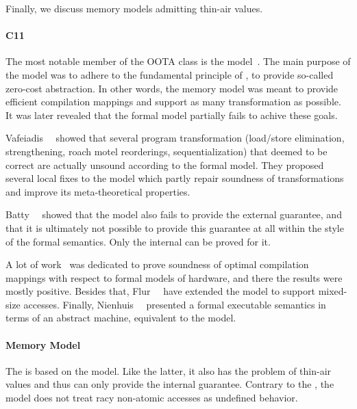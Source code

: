 Finally, we discuss memory models admitting thin-air values. 

\paragraph{C11}

The most notable member of the OOTA class is the \CMM model~\cite{Batty-al:POPL11}.
The main purpose of the \CMM model was to adhere to the fundamental principle of \CPP, 
\ie to provide so-called zero-cost abstraction. 
In other words, the memory model was meant to provide 
efficient compilation mappings and support as many transformation as possible.
It was later revealed that the formal model partially fails to achive these goals.

Vafeiadis~\etal~\cite{Vafeiadis-al:POPL15} showed that several program transformation 
(load/store elimination, strengthening, roach motel reorderings, sequentialization) 
that deemed to be correct are actually unsound according to the formal model.
They proposed several local fixes to the model which 
partly repair soundness of transformations and improve 
its meta-theoretical properties. 

Batty~\etal~\cite{Batty-al:ESOP15} showed that 
the model also fails to provide the external \DRF guarantee, 
and that it is ultimately not possible to provide this guarantee
at all within the style of the \CMM formal semantics.
Only the internal \DRF can be proved for it. 

A lot of work~\cite{Batty-al:POPL11, Sarkar-al:PLDI12, Batty-al:POPL12, Batty-al:POPL16} 
was dedicated to prove soundness of optimal compilation mappings 
with respect to formal models of hardware, 
and there the results were mostly positive.
Besides that, Flur~\etal~\cite{Flur-al:POPL17} have extended 
the model to support mixed-size accesses.
Finally, Nienhuis~\etal~\cite{Nienhuis-al:OOPSLA16} presented 
a formal executable semantics in terms of an abstract machine, 
equivalent to the \CMM model. 

\paragraph{\JS Memory Model}

The \JSMM is based on the \CMM model. 
Like the latter, it also has the problem of thin-air values
and thus can only provide the internal \DRF guarantee. 
Contrary to the \CMM, the \JS model does not treat 
racy non-atomic accesses as undefined behavior. 

